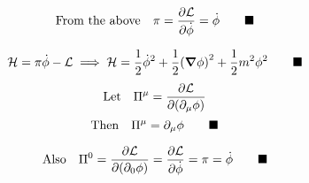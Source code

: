 \documentclass{article}
\begin{document}
\[\qq*{From the above}\pi=\pdv{\mathcal{L}}{\dot{\phi}}=\dot{\phi}\qquad\blacksquare\]

\[\mathcal{H}=\pi \dot{\phi}-\mathcal{L}\implies \mathcal{H}=\frac{1}{2}\dot{\phi}^2+\frac{1}{2}\qty(\grad \phi)^2+\frac{1}{2}m^2 \phi^2 \qquad\blacksquare\]
\[\qq*{Let}\Pi^{\mu}=\pdv{\mathcal{L}}{(\partial_{\mu}\phi)}
\]
\[\qq*{Then}\Pi^{\mu}=\partial_{\mu}\phi \qquad\blacksquare\]

\[\qq*{Also}\Pi^{0}=\pdv{\mathcal{L}}{(\partial_{0}\phi)}=\pdv{\mathcal{L}}{\dot{\phi}}=\pi=\dot{\phi}
\qquad\blacksquare\]
\end{document}
